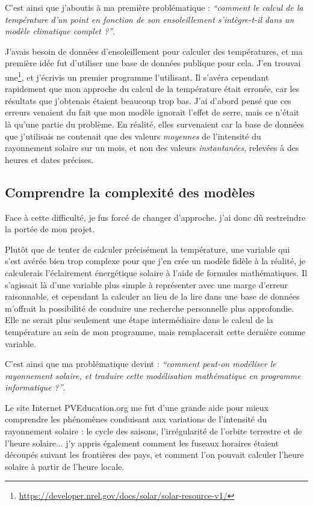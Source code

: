 \documentclass[12pt,a4paper]{article}
\begin{document}
C'est ainsi que j'aboutis à ma première problématique : \emph{``comment le calcul de la température d'un point en fonction de son ensoleillement s'intègre-t-il dans un modèle climatique complet ?''}.

J'avais besoin de données d'ensoleillement pour calculer des températures, et ma première idée fut d'utiliser une base de données publique pour cela.
J'en trouvai une\footnote{\url{https://developer.nrel.gov/docs/solar/solar-resource-v1/}}, et j'écrivis un premier programme l'utilisant.
Il s'avéra cependant rapidement que mon approche du calcul de la température était erronée, car les résultats que j'obtenais étaient beaucoup trop bas.
J'ai d'abord pensé que ces erreurs venaient du fait que mon modèle ignorait l'effet de serre, mais ce n'était là qu'une partie du problème.
En réalité, elles survenaient car la base de données que j'utilisais ne contenait que des valeurs \emph{moyennes} de l'intensité du rayonnement solaire sur un mois, et non des valeurs \emph{instantanées}, relevées à des heures et dates précises.

\subsection{Comprendre la complexité des modèles}
Face à cette difficulté, je fus forcé de changer d'approche.
j'ai donc dû restreindre la portée de mon projet.

Plutôt que de tenter de calculer précisément la température, une variable qui s'est avérée bien trop complexe pour que j'en crée un modèle fidèle à la réalité, je calculerais l'éclairement énergétique solaire à l'aide de formules mathématiques.
Il s'agissait là d'une variable plus simple à représenter avec une marge d'erreur raisonnable, et cependant la calculer au lieu de la lire dans une base de données m'offrait la possibilité de conduire une recherche personnelle plus approfondie.
Elle ne serait plus seulement une étape intermédiaire dans le calcul de la température au sein de mon programme, mais remplacerait cette dernière comme variable.

C'est ainsi que ma problématique devint : \emph{``comment peut-on modéliser le rayonnement solaire, et traduire cette modélisation mathématique en programme informatique ?''}.

Le site Internet PVEducation.org me fut d'une grande aide pour mieux comprendre les phénomènes conduisant aux variations de l'intensité du rayonnement solaire : le cycle des saisons, l'irrégularité de l'orbite terrestre et de l'heure solaire... j'y appris également comment les fuseaux horaires étaient découpés suivant les frontières des pays, et comment l'on pouvait calculer l'heure solaire à partir de l'heure locale.
\end{document}
